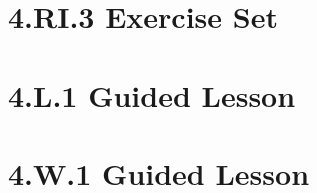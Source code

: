 \documentclass[a4paper,12pt]{article}
\begin{document}
\newpage
\section{4.RI.3 Exercise Set}


\newpage
\section{4.L.1 Guided Lesson}


% 

\newpage
\section{4.W.1 Guided Lesson}


% 
\end{document}
